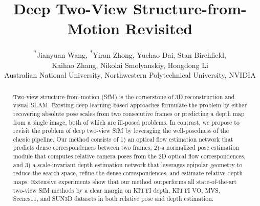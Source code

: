 \documentclass[final]{cvpr}
\begin{document}
\def\YD#1{{\color{red}{\bf [Yuchao:} {{#1}}{\bf ]}}}
\def\JY#1{{\color{blue}{\bf [JY:} {{#1}}{\bf ]}}}
\def\HL#1{{\color{green}{\bf [HL:} {{#1}}{\bf ]}}}
\def\YR#1{{\color{almond}{\bf [YR:} {{#1}}{\bf ]}}}



\title{Deep Two-View Structure-from-Motion Revisited}




\author{\textsuperscript{*}Jianyuan Wang, \textsuperscript{*}Yiran Zhong, Yuchao Dai, Stan Birchfield, \\
Kaihao Zhang, Nikolai Smolyanskiy, Hongdong Li \\
Australian National University, 
Northwestern Polytechnical University,
NVIDIA}



\maketitle
\pagestyle{empty}  \thispagestyle{empty} 





\begin{abstract}

Two-view structure-from-motion (SfM) is the cornerstone of 3D reconstruction and visual SLAM.
Existing deep learning-based approaches formulate the problem by either recovering absolute pose scales from two consecutive frames or predicting a depth map from a single image, both of which are ill-posed problems. 
In contrast, we propose to revisit the problem of deep two-view SfM by leveraging the well-posedness of the classic pipeline.
Our method consists of 1) an optical flow estimation network that predicts dense correspondences between two frames; 2) a normalized pose estimation module that computes relative camera poses from the 2D optical flow correspondences, and 3) a scale-invariant depth estimation network that leverages epipolar geometry to reduce the search space, refine the dense correspondences, and estimate relative depth maps.
Extensive experiments show that our method outperforms all state-of-the-art two-view SfM methods by a clear margin on KITTI depth, KITTI VO, MVS, Scenes11, and SUN3D datasets in both relative pose and depth estimation. 


\end{abstract}
\end{document}
